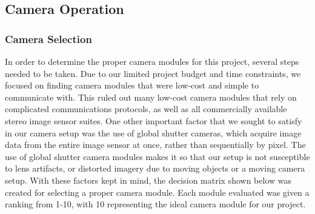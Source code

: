 \subsection{Camera Operation}
\subsubsection{Camera Selection}  \label{camdecision}
In order to determine the proper camera modules for this project, several steps needed to be taken. Due to our limited project budget and time constraints, we focused on finding camera modules that were low-cost and simple to communicate with. This ruled out many low-cost camera modules that rely on complicated communications protocols, as well as all commercially available stereo image sensor suites. One other important factor that we sought to satisfy in our camera setup was the use of global shutter cameras, which acquire image data from the entire image sensor at once, rather than sequentially by pixel. The use of global shutter camera modules makes it so that our setup is not susceptible to lens artifacts, or distorted imagery due to moving objects or a moving camera setup. With these factors kept in mind, the decision matrix shown below was created for selecting a proper camera module. Each module evaluated was given a ranking from 1-10, with 10 representing the ideal camera module for our project. 
\par
\singlespacing
